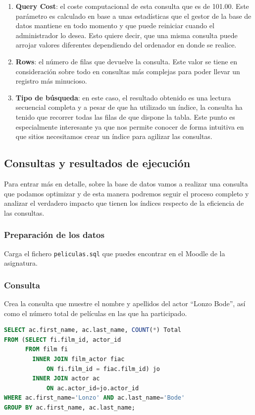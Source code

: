 \documentclass{db-practice}
\begin{document}
\begin{enumerate}
    \item \textbf{Query Cost}: el coste computacional de esta consulta que es de 101.00.  Este parámetro es calculado en base a unas estadísticas que el gestor de la base de datos mantiene en todo momento y que puede reiniciar cuando el administrador lo desea. Esto quiere decir, que una misma consulta puede arrojar valores diferentes dependiendo del ordenador en donde se realice. 
    \item \textbf{Rows}: el número de filas que devuelve la consulta. Este valor se tiene en consideración sobre todo en consultas más complejas para poder llevar un registro más minucioso.
    \item \textbf{Tipo de búsqueda}: en este caso, el resultado obtenido es una lectura secuencial completa y a pesar de que ha utilizado un índice, la consulta ha tenido que recorrer todas las filas de que dispone la tabla. Este punto es especialmente interesante ya que nos permite conocer de forma intuitiva en que sitios necesitamos crear un índice para agilizar las consultas.
\end{enumerate}

\subsection*{Consultas y resultados de ejecución}

Para entrar más en detalle, sobre la base de datos vamos a realizar una consulta que podamos optimizar y de esta manera podremos seguir el proceso completo y analizar el verdadero impacto que tienen los índices respecto de la eficiencia de las consultas.

\subsubsection*{Preparación de los datos}

Carga el fichero \texttt{peliculas.sql} que puedes encontrar en el Moodle de la asignatura.

\subsubsection*{Consulta}

Crea la consulta que muestre el nombre y apellidos del actor ``Lonzo Bode'', así como el número total de películas en las que ha participado.

\newpage
\begin{lstlisting}[language=SQL]
SELECT ac.first_name, ac.last_name, COUNT(*) Total
FROM (SELECT fi.film_id, actor_id 
      FROM film fi 
        INNER JOIN film_actor fiac 
            ON fi.film_id = fiac.film_id) jo 
        INNER JOIN actor ac 
            ON ac.actor_id=jo.actor_id
WHERE ac.first_name='Lonzo' AND ac.last_name='Bode'
GROUP BY ac.first_name, ac.last_name;
\end{lstlisting} 
\end{document}

